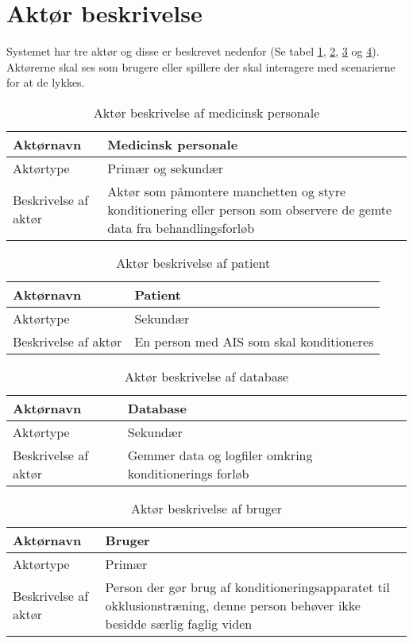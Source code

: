 	\newpage
	\section{Aktør beskrivelse}
	Systemet har tre aktør og disse er beskrevet nedenfor (Se tabel \ref{tab:medi}, \ref{tab:patient}, \ref{tab:data} og \ref{tab:bruger}). Aktørerne skal ses som brugere eller spillere der skal interagere med scenarierne for at de lykkes. 
	
	\begin{table}[H]
		\centering
		\begin{tabular}{ | p{} | p{}| } 
			\hline
			Aktørnavn& Medicinsk personale  \\ 
			\hline
			Aktørtype & Primær og sekundær \\ 
			\hline
			Beskrivelse af aktør & Aktør som påmontere manchetten og styre konditionering eller person som observere de gemte data fra behandlingsforløb\\ 
			\hline
		\end{tabular}
		\caption{Aktør beskrivelse af medicinsk personale} \label{tab:medi}
	\end{table}
	
	\begin{table}[H]
		\centering
		\begin{tabular}{ | p{} | p{}| } 
			\hline
			Aktørnavn& Patient \\ 
			\hline
			Aktørtype & Sekundær \\ 
			\hline
			Beskrivelse af aktør & En person med AIS som skal konditioneres\\ 
			\hline
		\end{tabular}
		\caption{Aktør beskrivelse af patient} \label{tab:patient}
	\end{table}
	
	\begin{table}[H]
		\centering
		\begin{tabular}{ | p{} | p{}| } 
			\hline
			Aktørnavn& Database \\ 
			\hline
			Aktørtype & Sekundær \\ 
			\hline
			Beskrivelse af aktør & Gemmer data og logfiler omkring konditionerings forløb\\ 
			\hline
		\end{tabular}
		\caption{Aktør beskrivelse af database} \label{tab:data}
	\end{table}
	
	\begin{table}[H]
		\centering
		\begin{tabular}{ | p{} | p{}| } 
			\hline
			Aktørnavn& Bruger \\ 
			\hline
			Aktørtype & Primær \\ 
			\hline
			Beskrivelse af aktør & Person der gør brug af konditioneringsapparatet til okklusionstræning, denne person behøver ikke besidde særlig faglig viden \\ 
			\hline
		\end{tabular}
		\caption{Aktør beskrivelse af bruger} \label{tab:bruger}
	\end{table}